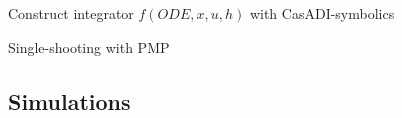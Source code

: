 \begin{algorithm}[H]
\SetAlgoLined
{}
Construct integrator $f(ODE, x, u, h)$ with CasADI-symbolics\\
 \caption{Single-shooting with PMP}
 \label{alg:SingleShooting_Integration_PMP}
\end{algorithm}

\subsection{Simulations}





